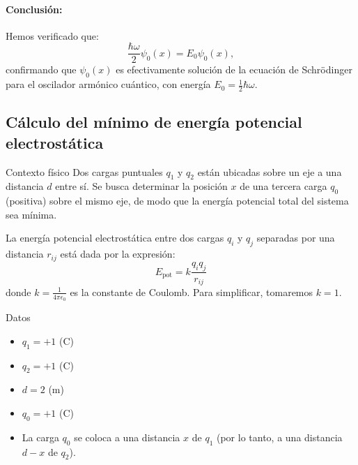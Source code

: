 \documentclass[12pt, a4paper]{article}
\theoremstyle{rioplatense}
\begin{document}
\paragraph{Conclusión:}
Hemos verificado que:
\begin{equation*}
    \frac{\hbar\omega}{2} \psi_0(x) = E_0 \psi_0(x),
\end{equation*}
confirmando que \(\psi_0(x)\) es efectivamente solución de la ecuación de Schrödinger para el oscilador armónico cuántico, con energía \(E_0 = \frac{1}{2}\hbar\omega\).

\subsection{Cálculo del mínimo de energía potencial electrostática}

\begin{paragraph}{Contexto físico}
Dos cargas puntuales \( q_1 \) y \( q_2 \) están ubicadas sobre un eje a una distancia \( d \) entre sí. Se busca determinar la posición \( x \) de una tercera carga \( q_0 \) (positiva) sobre el mismo eje, de modo que la energía potencial total del sistema sea mínima.

La energía potencial electrostática entre dos cargas \( q_i \) y \( q_j \) separadas por una distancia \( r_{ij} \) está dada por la expresión:
$$
E_{\text{pot}} = k \frac{q_i q_j}{r_{ij}}
$$
donde \( k = \frac{1}{4 \pi \epsilon_0} \) es la constante de Coulomb. Para simplificar, tomaremos \( k = 1 \).
\end{paragraph}

\begin{paragraph}{Datos}
\begin{itemize}
    \item \( q_1 = +1 \) (C)
    \item \( q_2 = +1 \) (C)
    \item \( d = 2 \) (m)
    \item \( q_0 = +1 \) (C)
    \item La carga \( q_0 \) se coloca a una distancia \( x \) de \( q_1 \) (por lo tanto, a una distancia \( d - x \) de \( q_2 \)).
\end{itemize}
\end{paragraph}

\end{document}
